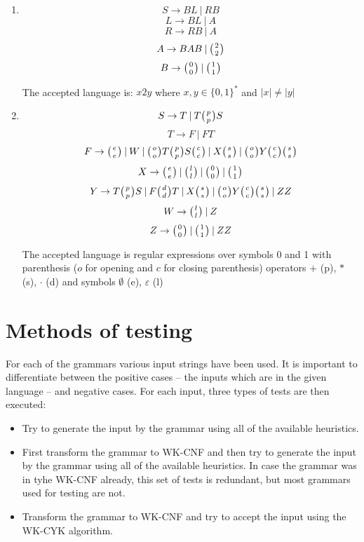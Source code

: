 \begin{enumerate}
{    The accepted language is: $w: \#_a = \#_b$ and for any prefix of $w: \#_a \geq \#_b$ ($\#_a, \#_b$ are counts of symbols $a$ and $b$)
  }

  \item{
    $$S \rightarrow B L \:|\: R B$$
    $$L \rightarrow B L \:|\: A$$
    $$R \rightarrow R B \:|\: A$$
    $$A \rightarrow B A B \:|\: \wkpair{2}{2}$$
    $$B \rightarrow \wkpair{0}{0} \:|\: \wkpair{1}{1}$$

    The accepted language is: $x2y$ where $x, y \in \{0, 1\}^* $ and $|x| \neq |y|$
  }

  \item{
    $$S \rightarrow T \:|\: T \wkpair{p}{p} S$$
    $$T \rightarrow F \:|\: F T$$
    $$F \rightarrow \wkpair{e}{e} \:|\: W \:|\: \wkpair{o}{o} T \wkpair{p}{p} S \wkpair{c}{c} \:|\: X \wkpair{s}{s} \:|\: \wkpair{o}{o} Y \wkpair{c}{c} \wkpair{s}{s}$$
    $$X \rightarrow \wkpair{e}{e} \:|\: \wkpair{l}{l} \:|\: \wkpair{0}{0} \:|\: \wkpair{1}{1}$$
    $$Y \rightarrow T \wkpair{p}{p} S \:|\: F \wkpair{d}{d} T \:|\: X \wkpair{s}{s} \:|\: \wkpair{o}{o} Y \wkpair{c}{c} \wkpair{s}{s} \:|\: Z Z$$
    $$W \rightarrow \wkpair{l}{l} \:|\: Z$$
    $$Z \rightarrow \wkpair{0}{0} \:|\: \wkpair{1}{1} \:|\: Z Z$$

    The accepted language is regular expressions over symbols 0 and 1 with parenthesis ($o$ for opening and $c$ for closing parenthesis) operators $+$ (p), $*$ (s), $\cdot$ (d) and symbols $\emptyset$ (e), $\varepsilon$ (l)
  }
\end{enumerate}

\section{Methods of testing}
For each of the grammars various input strings have been used. It is important to differentiate between the positive cases -- the inputs which are in the given language -- and negative cases.
For each input, three types of tests are then executed:
\begin{itemize}
  \item{Try to generate the input by the grammar using all of the available heuristics.}
  \item{First transform the grammar to WK-CNF and then try to generate the input by the grammar using all of the available heuristics. In case the grammar was in tyhe WK-CNF already, this set of tests is redundant, but most grammars used for testing are not.}
  \item{Transform the grammar to WK-CNF and try to accept the input using the WK-CYK algorithm.}
\end{itemize}

